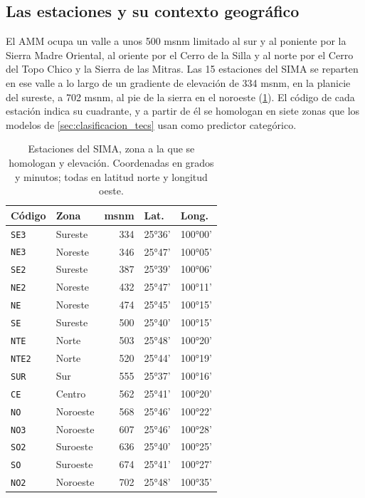 \subsection{Las estaciones y su contexto geográfico}
\label{sec:contexto-estaciones}

El AMM ocupa un valle a unos 500 msnm limitado al sur y al poniente por la
Sierra Madre Oriental, al oriente por el Cerro de la Silla y al norte por el
Cerro del Topo Chico y la Sierra de las Mitras. Las 15 estaciones del SIMA se
reparten en ese valle a lo largo de un gradiente de elevación de 334 msnm,
en la planicie del sureste, a 702 msnm, al pie de la sierra en el noroeste
(\cref{tab:estaciones}). El código de cada estación indica su cuadrante, y a
partir de él se homologan en siete zonas que los modelos de
\cref{sec:clasificacion_tecs} usan como predictor categórico.

\begin{table}[pos=t]
  \centering
  \caption{Estaciones del SIMA, zona a la que se homologan y elevación.
    Coordenadas en grados y minutos; todas en latitud norte y longitud
    oeste.}
  \label{tab:estaciones}
  \small
  \begin{tabular}{llrll}
    \toprule
    Código & Zona & msnm & Lat. & Long. \\
    \midrule
    \texttt{SE3}  & Sureste  & 334 & 25°36' & 100°00'  \\
    \texttt{NE3}  & Noreste  & 346 & 25°47' & 100°05' \\
    \texttt{SE2}  & Sureste  & 387 & 25°39' & 100°06' \\
    \texttt{NE2}  & Noreste  & 432 & 25°47' & 100°11' \\
    \texttt{NE}   & Noreste  & 474 & 25°45' & 100°15' \\
    \texttt{SE}   & Sureste  & 500 & 25°40' & 100°15' \\
    \texttt{NTE}  & Norte    & 503 & 25°48' & 100°20' \\
    \texttt{NTE2} & Norte    & 520 & 25°44' & 100°19' \\
    \texttt{SUR}  & Sur      & 555 & 25°37' & 100°16' \\
    \texttt{CE}   & Centro   & 562 & 25°41' & 100°20' \\
    \texttt{NO}   & Noroeste & 568 & 25°46' & 100°22' \\
    \texttt{NO3}  & Noroeste & 607 & 25°46' & 100°28' \\
    \texttt{SO2}  & Suroeste & 636 & 25°40' & 100°25' \\
    \texttt{SO}   & Suroeste & 674 & 25°41' & 100°27' \\
    \texttt{NO2}  & Noroeste & 702 & 25°48' & 100°35' \\
    \bottomrule
  \end{tabular}
\end{table}


